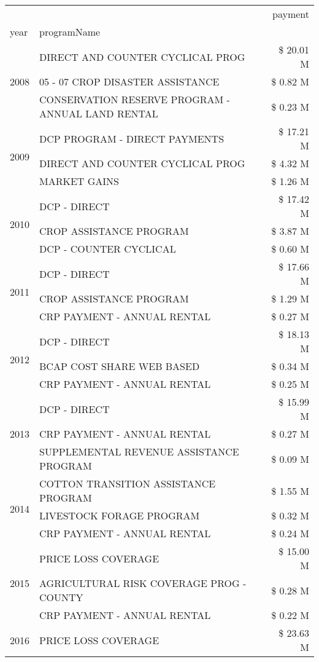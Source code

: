 \begin{tabular}{llr}
\toprule
 &  & payment \\
year & programName &  \\
\midrule
\multirow[t]{3}{*}{2008} & DIRECT AND COUNTER CYCLICAL PROG & \$ 20.01 M \\
 & 05 - 07 CROP DISASTER ASSISTANCE & \$ 0.82 M \\
 & CONSERVATION RESERVE PROGRAM - ANNUAL LAND RENTAL & \$ 0.23 M \\
\cline{1-3}
\multirow[t]{3}{*}{2009} & DCP PROGRAM - DIRECT PAYMENTS & \$ 17.21 M \\
 & DIRECT AND COUNTER CYCLICAL PROG & \$ 4.32 M \\
 & MARKET GAINS & \$ 1.26 M \\
\cline{1-3}
\multirow[t]{3}{*}{2010} & DCP - DIRECT & \$ 17.42 M \\
 & CROP ASSISTANCE PROGRAM & \$ 3.87 M \\
 & DCP - COUNTER CYCLICAL & \$ 0.60 M \\
\cline{1-3}
\multirow[t]{3}{*}{2011} & DCP - DIRECT & \$ 17.66 M \\
 & CROP ASSISTANCE PROGRAM & \$ 1.29 M \\
 & CRP PAYMENT - ANNUAL RENTAL & \$ 0.27 M \\
\cline{1-3}
\multirow[t]{3}{*}{2012} & DCP - DIRECT & \$ 18.13 M \\
 & BCAP COST SHARE WEB BASED & \$ 0.34 M \\
 & CRP PAYMENT - ANNUAL RENTAL & \$ 0.25 M \\
\cline{1-3}
\multirow[t]{3}{*}{2013} & DCP - DIRECT & \$ 15.99 M \\
 & CRP PAYMENT - ANNUAL RENTAL & \$ 0.27 M \\
 & SUPPLEMENTAL REVENUE ASSISTANCE PROGRAM & \$ 0.09 M \\
\cline{1-3}
\multirow[t]{3}{*}{2014} & COTTON TRANSITION ASSISTANCE PROGRAM & \$ 1.55 M \\
 & LIVESTOCK FORAGE PROGRAM & \$ 0.32 M \\
 & CRP PAYMENT - ANNUAL RENTAL & \$ 0.24 M \\
\cline{1-3}
\multirow[t]{3}{*}{2015} & PRICE LOSS COVERAGE & \$ 15.00 M \\
 & AGRICULTURAL RISK COVERAGE PROG - COUNTY & \$ 0.28 M \\
 & CRP PAYMENT - ANNUAL RENTAL & \$ 0.22 M \\
\cline{1-3}
\multirow[t]{3}{*}{2016} & PRICE LOSS COVERAGE & \$ 23.63 M \\

\end{tabular}

